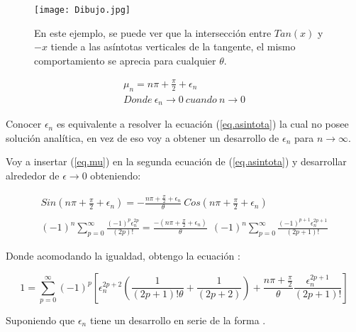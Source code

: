 \begin{figure}
    \centering
    \texttt{[image: Dibujo.jpg]}
    \caption{En este ejemplo, se puede ver que la intersección entre $Tan(x)$ y $-x$ tiende a las asíntotas verticales de la tangente, el mismo comportamiento se aprecia para cualquier $ \theta $.}
    \label{fig:Dibujo1}
\end{figure}

\begin{equation}
\begin{array}{c}
    \mu _n = n \pi + \frac{\pi}{2} + \epsilon _n \\
    Donde \ \epsilon _n \rightarrow{0}  \ cuando \ n \rightarrow{0}
\end{array}
\label{eq.mu}
\end{equation}


Conocer $\epsilon _n $ es equivalente a resolver la ecuación (\ref{eq.asintota}) la cual no posee solución analítica, en vez de eso voy a obtener un desarrollo de $\epsilon _n $ para $n \rightarrow \infty$.

Voy a insertar (\ref{eq.mu}) en la segunda ecuación de (\ref{eq.asintota}) y desarrollar alrededor de $\epsilon \rightarrow{0}$ obteniendo:

\begin{equation}
\begin{array}{c}
    Sin( n \pi + \frac{\pi}{2} + \epsilon _n ) = 
    - \frac{n \pi + \frac{\pi}{2} + \epsilon _n}{\theta}  \ Cos( n \pi + \frac{\pi}{2} + \epsilon _n )  \\
 \\

         (-1) ^n \sum _{p=0} ^{\infty} \frac{(-1) ^p  \epsilon _n ^{2 p }}{(2p)!} 
    =  \frac{-(n \pi + \frac{\pi}{2} + \epsilon _n) }{\theta}  \  \	
    (-1) ^n
     \sum _{p=0} ^{\infty} \frac{(-1) ^ {p+1} \epsilon _n ^{2 p + 1}}{(2p+1)!} 
\end{array}
\end{equation}


Donde acomodando la igualdad, obtengo la ecuación :

\begin{equation}
    1 = 
    \sum _{p=0} ^{\infty} (-1) ^p     \left[
   	\epsilon _n ^{2p+2 }\left( \frac{1}{(2p+1)! \theta } + \frac{1}{(2p+2)} \right) +
  	\frac{n \pi + \frac{\pi}{2}}{\theta} \frac{  \epsilon _n ^{2p+1}}{(2p+1)!} 			\right]
\label{igualdad epsilon}
\end{equation}

Suponiendo que $\epsilon _n $ tiene un desarrollo en serie de la forma .

